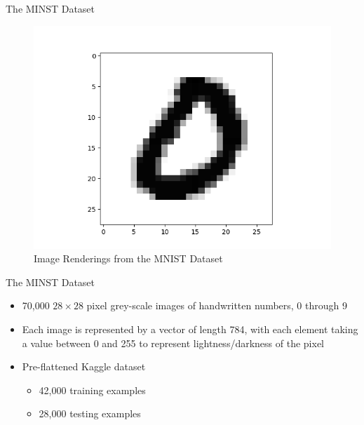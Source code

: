 \documentclass[titlepage,leqno]{beamer}%
\begin{document}
\begin{frame}{The MINST Dataset}
\begin{figure}[h]
\begin{minipage}[t]{0.3\textwidth}
    \end{minipage}
    \begin{minipage}[t]{0.3\textwidth}
        \includegraphics[width=\textwidth]{img6render.png}
    \end{minipage}
  \caption{Image Renderings from the MNIST Dataset}
\end{figure}
\end{frame}
\begin{frame}{The MINST Dataset}
\begin{itemize}
	\item 70,000 $28\times 28$ pixel grey-scale images of handwritten numbers, 0 through 9
	\vspace{3.5mm}
	\item Each image is represented by a vector of length 784, with each element taking a value between 0 and 255 to represent lightness/darkness of the pixel
	\vspace{3.5mm}
	\item Pre-flattened Kaggle dataset
	\begin{itemize}
		\item 42,000 training examples
		\item 28,000 testing examples
	\end{itemize}
\end{itemize}
\end{frame}
\end{document}
